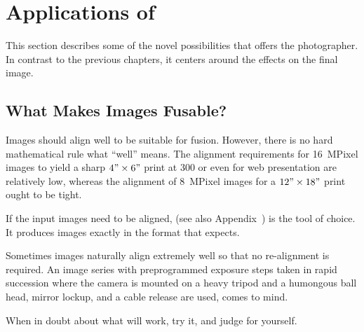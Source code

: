 

\chapter[Applications of \App]{Applications of \App
  \label{sec:applications}
  }

This section describes some of the novel possibilities that \App{}
offers the photographer.  In contrast to the previous chapters, it
centers around the effects on the final image.

\section[What Makes Images Fusable?]{What Makes Images Fusable?
  \label{sec:what-makes-images-fusable}
  }

\begin{sloppypar}
  Images should align well to be suitable for fusion.  However, there
  is no hard mathematical rule what ``well'' means.  The alignment
  requirements for 16~MPixel images to yield a sharp $4" \times 6"$
  print at 300 or even for web presentation are relatively
  low, whereas the alignment of 8~MPixel images for a $12" \times 18"$
  print ought to be tight.
\end{sloppypar}

If the input images need to be aligned,
 (see also
Appendix~) is the tool of choice.  It produces
images exactly in the format that \App{} expects.

Sometimes images naturally align extremely well so that no
re-alignment is required.  An image series with preprogrammed exposure
steps taken in rapid succession where the camera is mounted on a heavy
tripod and a humongous ball head, mirror lockup, and a cable release
are used, comes to mind.

When in doubt about what will work, try it, and judge for yourself.

